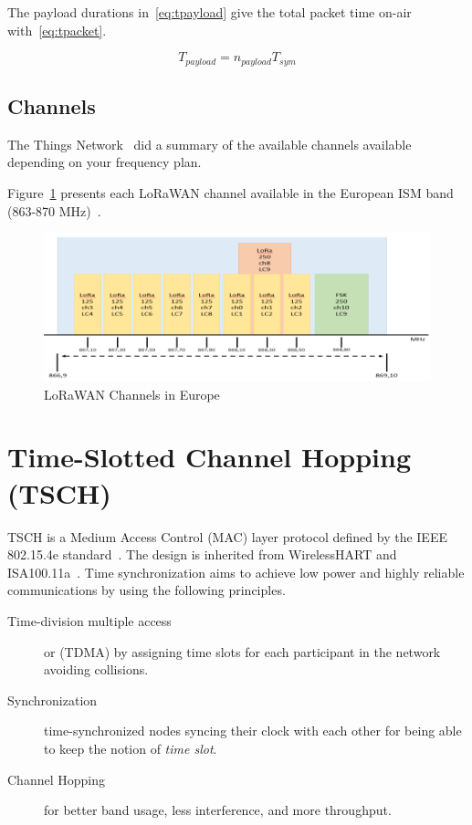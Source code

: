 The payload durations in~\ref{eq:tpayload} give the total packet time on-air
with~\ref{eq:tpacket}.

\begin{equation}
  \label{eq:tpayload}
  T_{payload} = n_{payload} T_{sym}
\end{equation}


\subsection{Channels}

The Things Network~\cite{ttnfrequencyplans} did a summary of the available
channels available depending on your frequency plan.

Figure~\ref{fig:channels} presents each LoRaWAN channel available in the
European ISM band (863-870 MHz)~\cite{Polonelli_2019}.

\begin{figure}[H]
  \centering
  \includegraphics[width=\textwidth]{thesis.tex/chapters/context/fig/channels.png}
  \caption{LoRaWAN Channels in Europe\cite{Polonelli_2019}\label{fig:channels}}
\end{figure}


\section{Time-Slotted Channel Hopping (TSCH)}

TSCH is a Medium Access Control (MAC) layer protocol defined by the IEEE
802.15.4e standard~\cite{rfc7554}.
The design is inherited from WirelessHART and
ISA100.11a~\cite{Duquennoy2017TSCHA6}.
Time synchronization aims to achieve low power and highly reliable
communications by using the following principles.

\begin{description}
  \item[Time-division multiple access] or (TDMA) by assigning time slots for each
    participant in the network avoiding collisions.
  \item[Synchronization] time-synchronized nodes syncing their clock with each
    other for being able to keep the notion of \emph{time slot}.
  \item[Channel Hopping] for better band usage, less interference, and more
    throughput.
\end{description}

